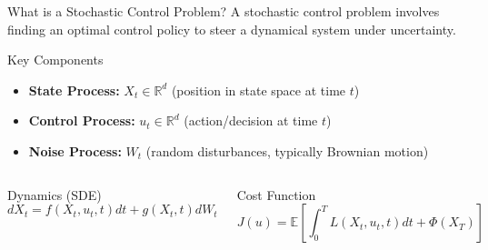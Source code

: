 \documentclass[aspectratio=169,xcolor=dvipsnames]{beamer}
\begin{document}
\begin{frame}{What is a Stochastic Control Problem?}
    A stochastic control problem involves finding an optimal control policy to steer a dynamical system under uncertainty.
    
    \vspace{0.3cm}
    
    \begin{block}{Key Components}
        \begin{itemize}
            \item \textbf{State Process:} $X_t \in \mathbb{R}^d$ (position in state space at time $t$)
            \item \textbf{Control Process:} $u_t \in \mathbb{R}^d$ (action/decision at time $t$)
            \item \textbf{Noise Process:} $W_t$ (random disturbances, typically Brownian motion)
        \end{itemize}
    \end{block}
    
    \begin{columns}[t]
        \begin{alertblock}{Dynamics (SDE)}
            \vspace{-0.1cm}
            \begin{equation}
            dX_t = f(X_t, u_t, t) dt + g(X_t, t) dW_t
            \end{equation}
            \vspace{-0.2cm}
        \end{alertblock}
        
        \begin{alertblock}{Cost Function}
            \vspace{-0.1cm}
            \begin{equation}
            J(u) = \mathbb{E}\left[\int_0^T L(X_t, u_t, t) dt + \Phi(X_T)\right]
            \end{equation}
            \vspace{-0.2cm}
        \end{alertblock}
    \end{columns}
\end{frame}
\end{document}
